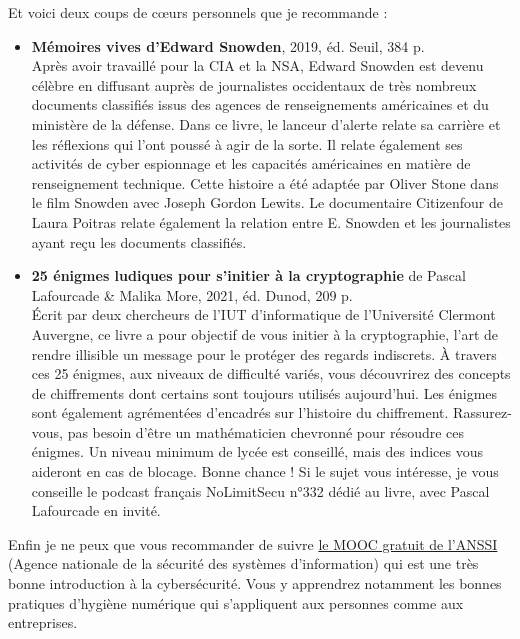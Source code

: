 \documentclass[a4paper]{article}
\begin{document}
Et voici deux coups de cœurs personnels que je recommande :
\\
\begin{itemize}

\item \textbf{Mémoires vives d’Edward Snowden}, 2019, éd. Seuil, 384 p.
\\
Après avoir travaillé pour la CIA et la NSA, Edward Snowden est devenu célèbre en diffusant auprès de journalistes occidentaux de très nombreux documents classifiés issus des agences de renseignements américaines et du ministère de la défense. Dans ce livre, le lanceur d’alerte relate sa carrière et les réflexions qui l’ont poussé à agir de la sorte. Il relate également ses activités de cyber espionnage et les capacités américaines en matière de renseignement technique. Cette histoire a été adaptée par Oliver Stone dans le film Snowden avec Joseph Gordon Lewits. Le documentaire Citizenfour de Laura Poitras relate également la relation entre E. Snowden et les journalistes ayant reçu les documents classifiés. 
\\
\item \textbf{25 énigmes ludiques pour s’initier à la cryptographie} de Pascal Lafourcade & Malika More, 2021, éd. Dunod, 209 p.
\\
Écrit par deux chercheurs de l’IUT d’informatique de l’Université Clermont Auvergne, ce livre a pour objectif de vous initier à la cryptographie, l’art de rendre illisible un message pour le protéger des regards indiscrets. À travers ces 25 énigmes, aux niveaux de difficulté variés, vous découvrirez des concepts de chiffrements dont certains sont toujours utilisés aujourd’hui. Les énigmes sont également agrémentées d’encadrés sur l’histoire du chiffrement. Rassurez-vous, pas besoin d’être un mathématicien chevronné pour résoudre ces énigmes. Un niveau minimum de lycée est conseillé, mais des indices vous aideront en cas de blocage. Bonne chance ! Si le sujet vous intéresse, je vous conseille le podcast français NoLimitSecu n°332 dédié au livre, avec Pascal Lafourcade en invité.
\\
\end{itemize}
Enfin je ne peux que vous recommander de suivre \href{https://secnumacademie.gouv.fr/}{le MOOC gratuit de l’ANSSI} (Agence nationale de la sécurité des systèmes d'information) qui est une très bonne introduction à la cybersécurité. Vous y apprendrez notamment les bonnes pratiques d’hygiène numérique qui s’appliquent aux personnes comme aux entreprises. 
\end{document}
